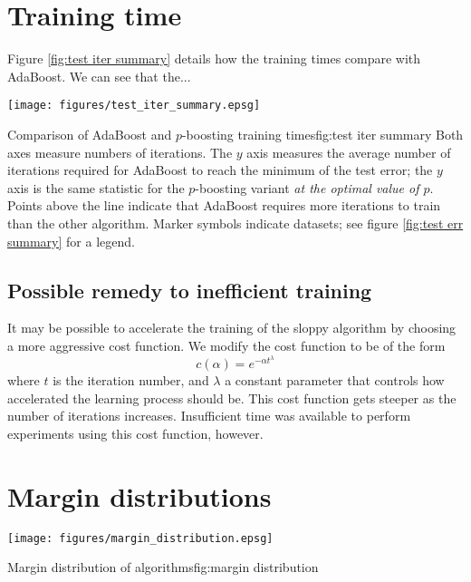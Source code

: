 \section{Training time}

Figure \ref{fig:test iter summary} details how the training times
compare with AdaBoost.  We can see that the...

\begin{linefigure}
\begin{center}
\texttt{[image: figures/test\_iter\_summary.epsg]}
\end{center}
\begin{capt}{Comparison of AdaBoost and $p$-boosting training
times}{fig:test iter summary} 
Both axes measure numbers of iterations.  The $y$ axis measures the
average number of iterations required for AdaBoost to reach the
minimum of the test error; the $y$ axis is the same statistic for the
$p$-boosting variant \emph{at the optimal value of $p$}.  Points above
the line indicate that AdaBoost requires more iterations to train than
the other algorithm.  Marker symbols indicate datasets; see figure
\ref{fig:test err summary} for a legend.
\end{capt}
\end{linefigure}

\subsection{Possible remedy to inefficient training}

It may be possible to accelerate the training of the sloppy algorithm
by choosing a more aggressive cost function.  We modify the cost
function to be of the form
%
\begin{equation}
c(\alpha) = e^{-\alpha t^\lambda}
\end{equation}
%
where $t$ is the iteration number, and $\lambda$ a constant parameter
that controls how accelerated the learning process should be.  This
cost function gets steeper as the number of iterations increases.
Insufficient time was available to perform experiments using this cost
function, however.


\section{Margin distributions}


\begin{linefigure}
\begin{center}
\texttt{[image: figures/margin\_distribution.epsg]}
\end{center}
\begin{capt}{Margin distribution of algorithms}{fig:margin distribution}
\end{capt}
\end{linefigure}


